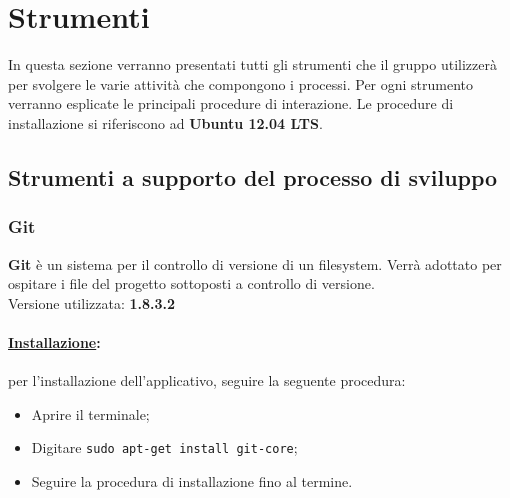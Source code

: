 \section{Strumenti}
\label{strumenti}
In questa sezione verranno presentati tutti gli strumenti che il gruppo \authorName{} utilizzerà per svolgere le varie attività che compongono i processi. Per ogni strumento verranno esplicate le principali procedure di interazione. Le procedure di installazione si riferiscono ad \textbf{Ubuntu 12.04 LTS}.

\subsection{Strumenti a supporto del processo di sviluppo}

\subsubsection{Git}
\label{git}
\textbf{Git} è un sistema per il controllo di versione di un filesystem. Verrà adottato per ospitare i file del progetto sottoposti a controllo di versione.\\
Versione utilizzata: \textbf{1.8.3.2}

\paragraph{\underline{Installazione}:} per l'installazione dell'applicativo, seguire la seguente procedura:
\begin{itemize}
\item Aprire il terminale;
\item Digitare \verb!sudo apt-get install git-core!;
\item Seguire la procedura di installazione fino al termine.
\end{itemize}

